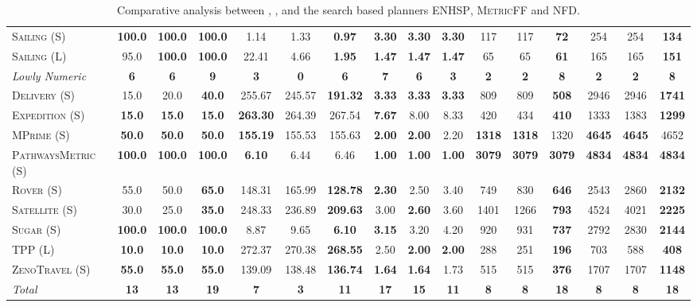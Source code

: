 \documentclass[11pt,landscape]{article}
\begin{document}
\begin{table*}[tb]
{\begin{tabular}{|l||ccc||ccc||ccc||ccc||ccc||}
\textsc{Sailing} (S)&\textbf{100.0}&\textbf{100.0}&\textbf{100.0}&1.14&1.33&\textbf{0.97}&\textbf{3.30}&\textbf{3.30}&\textbf{3.30}&117&117&\textbf{72}&254&254&\textbf{134}\\
\textsc{Sailing} (L)&95.0&\textbf{100.0}&\textbf{100.0}&22.41&4.66&\textbf{1.95}&\textbf{1.47}&\textbf{1.47}&\textbf{1.47}&65&65&\textbf{61}&165&165&\textbf{151}
\\\hline
\textit{Lowly Numeric}&\textbf{6}&\textbf{6}&\textbf{9}&\textbf{3}&\textbf{0}&\textbf{6}&\textbf{7}&\textbf{6}&\textbf{3}&\textbf{2}&\textbf{2}&\textbf{8}&\textbf{2}&\textbf{2}&\textbf{8}\\\hline
\textsc{Delivery} (S)&15.0&20.0&\textbf{40.0}&255.67&245.57&\textbf{191.32}&\textbf{3.33}&\textbf{3.33}&\textbf{3.33}&809&809&\textbf{508}&2946&2946&\textbf{1741}\\
\textsc{Expedition} (S)&\textbf{15.0}&\textbf{15.0}&\textbf{15.0}&\textbf{263.30}&264.39&267.54&\textbf{7.67}&8.00&8.33&420&434&\textbf{410}&1333&1383&\textbf{1299}\\
\textsc{MPrime} (S)&\textbf{50.0}&\textbf{50.0}&\textbf{50.0}&\textbf{155.19}&155.53&155.63&\textbf{2.00}&\textbf{2.00}&2.20&\textbf{1318}&\textbf{1318}&1320&\textbf{4645}&\textbf{4645}&4652\\
\textsc{PathwaysMetric} (S)&\textbf{100.0}&\textbf{100.0}&\textbf{100.0}&\textbf{6.10}&6.44&6.46&\textbf{1.00}&\textbf{1.00}&\textbf{1.00}&\textbf{3079}&\textbf{3079}&\textbf{3079}&\textbf{4834}&\textbf{4834}&\textbf{4834}\\
\textsc{Rover} (S)&55.0&50.0&\textbf{65.0}&148.31&165.99&\textbf{128.78}&\textbf{2.30}&2.50&3.40&749&830&\textbf{646}&2543&2860&\textbf{2132}\\
\textsc{Satellite} (S)&30.0&25.0&\textbf{35.0}&248.33&236.89&\textbf{209.63}&3.00&\textbf{2.60}&3.60&1401&1266&\textbf{793}&4524&4021&\textbf{2225}\\
\textsc{Sugar} (S)&\textbf{100.0}&\textbf{100.0}&\textbf{100.0}&8.87&9.65&\textbf{6.10}&\textbf{3.15}&3.20&4.20&920&931&\textbf{737}&2792&2830&\textbf{2144}\\
\textsc{TPP} (L)&\textbf{10.0}&\textbf{10.0}&\textbf{10.0}&272.37&270.38&\textbf{268.55}&2.50&\textbf{2.00}&\textbf{2.00}&288&251&\textbf{196}&703&588&\textbf{408}\\
\textsc{ZenoTravel} (S)&\textbf{55.0}&\textbf{55.0}&\textbf{55.0}&139.09&138.48&\textbf{136.74}&\textbf{1.64}&\textbf{1.64}&1.73&515&515&\textbf{376}&1707&1707&\textbf{1148}
\\\hline
\textit{Total}&\textbf{13}&\textbf{13}&\textbf{19}&\textbf{7}&\textbf{3}&\textbf{11}&\textbf{17}&\textbf{15}&\textbf{11}&\textbf{8}&\textbf{8}&\textbf{18}&\textbf{8}&\textbf{8}&\textbf{18}\\\hline

        \end{tabular}}
        \caption{Comparative analysis between \pattyg, \pattyh, \pattyf and the search based planners \textsc{ENHSP}, \textsc{MetricFF} and \textsc{NFD}.}
        \label{tab:experiments}
        \end{table*}
        
\end{document}
